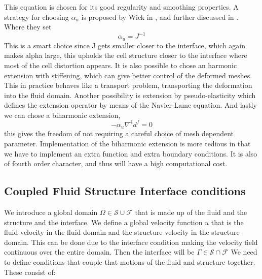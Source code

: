 This equation is chosen for its good regularity and smoothing properties.
A strategy for choosing $\alpha_u$ is proposed by Wick in \cite{Wick2011}, and further discussed in \cite{Stein2003}. Where they set 
\begin{equation}
\label{eq:alpha_u}
\alpha_u = J^{-1}
\end{equation} 
This is a smart choice since J gets smaller closer to the interface, which again makes alpha large, this upholds the cell structure closer to the interface where most of the cell distortion appears.  
It is also possible to chose an harmonic extension with stiffening, which can give better control of the deformed meshes. This in practice behaves like a transport problem, transporting the deformation into the fluid domain. Another possibility is extension by pseudo-elasticity which defines the extension operator by means of the Navier-Lame equation. And lastly we can chose a biharmonic extension, 
\begin{equation}
- \alpha_u \nabla^4 d^f = 0
\end{equation}
this gives the freedom of not requiring a careful choice of mesh dependent parameter. Implementation of the biharmonic extension is more tedious in that we have to implement an extra function and extra boundary conditions.  It is also of fourth order character, and thus will have a high computational cost. \cite{Richter2016}

\subsection*{Coupled Fluid Structure Interface conditions}
We introduce a global domain $\Omega \in \mathcal{S} \cup \mathcal{F} $ that is made up of the fluid and the structure and the interface. We define a global velocity function $u$ that is the fluid velocity in the fluid domain and the structure velocity in the structure domain. This can be done due to the interface condition making the velocity field continuous over the entire domain. Then the interface will be $ \Gamma \in \mathcal{S} \cap \mathcal{F}  $  
We need to define conditions that couple that motions of the fluid and structure together. These consist of:


